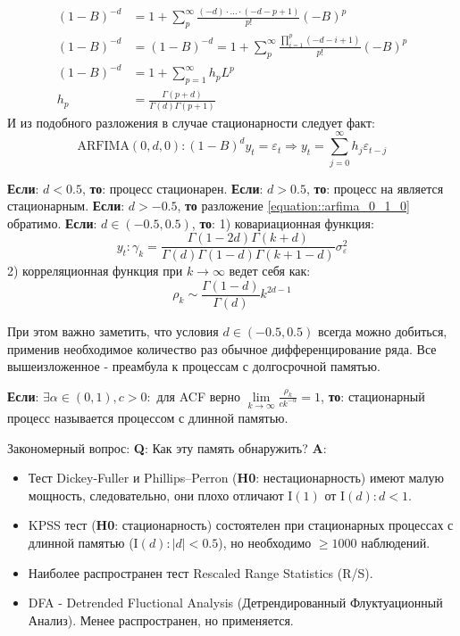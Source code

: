 \begin{equation}
	\begin{split}
		(1 - B)^{-d} & = 1 + \sum_{p}^{\infty} \frac{(-d)\cdot \ldots \cdot (-d -p + 1)}{p!} (-B)^{p}\\
		(1 - B)^{-d} & = (1 - B)^{-d} = 1 + \sum_{p}^{\infty} \frac{\prod_{i = 1}^{p}(-d - i + 1)}{p!} (-B)^{p}\\
		(1 - B)^{-d} & = 1 + \sum_{p = 1}^{\infty} h_pL^p\\
		h_p & = \frac{\Gamma(p + d)}{\Gamma(d)\Gamma(p + 1)}
	\end{split}
\end{equation}
И из подобного разложения \cite{quantil_2_2007} в случае стационарности следует факт:
\begin{equation} \label{equation::arfima_0_1_0}
	\text{ARFIMA}(0, d, 0): (1 - B)^d y_t = \varepsilon_{t} \Rightarrow y_t = \sum_{j = 0}^{\infty}h_j \varepsilon_{t - j}
\end{equation}
\begin{theorem}
	\textbf{Если}: $d < 0.5$, \textbf{то}: процесс стационарен. \textbf{Если}: $d > 0.5$, \textbf{то}: процесс на является стационарным. \textbf{Если}: $d > -0.5$, \textbf{то} разложение \ref{equation::arfima_0_1_0} обратимо. \textbf{Если}: $d \in (-0.5, 0.5)$, \textbf{то}: 1) ковариационная функция: $$y_t: \gamma_k = \frac{\Gamma(1 - 2d) \Gamma(k + d)}{\Gamma(d)\Gamma(1 - d)\Gamma(k + 1 - d)} \sigma^2_{\varepsilon}$$ 2) корреляционная функция при $k \to \infty$ ведет себя как: $$\rho_k \sim \frac{\Gamma(1 - d)}{\Gamma(d)}k^{2d - 1}$$
\end{theorem}
При этом важно заметить, что условия $d \in (-0.5, 0.5)$ всегда можно добиться, применив необходимое количество раз обычное дифференцирование ряда. Все вышеизложенное - преамбула к процессам с долгосрочной памятью.
\begin{definition}
	\textbf{Если}: $\exists \alpha \in (0, 1), c > 0:$ для ACF верно $\lim\limits_{k \to \infty} \frac{\rho_k}{ck^{-\alpha}} = 1$, \textbf{то}: стационарный процесс называется процессом с длинной памятью.
\end{definition}
Закономерный вопрос: \textbf{Q}: Как эту память обнаружить? \textbf{A}:
\begin{itemize}
	\item Тест Dickey-Fuller и Phillips–Perron (\textbf{H0}: нестационарность) имеют малую мощность, следовательно, они плохо отличают I$(1)$ от I$(d): d < 1$.
	\item KPSS тест (\textbf{H0}: стационарность) состоятелен при стационарных процессах с длинной памятью (I$(d): |d| < 0.5$), но необходимо $\ge 1000$ наблюдений.
	\item Наиболее распространен тест Rescaled Range Statistics (R/S). 
	\item DFA - Detrended Fluctional Analysis (Детрендированный Флуктуационный Анализ). Менее распространен, но применяется.
\end{itemize}
